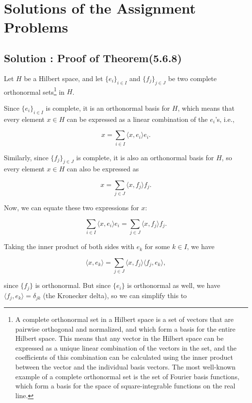 \documentclass[12pt, a4paper]{article} %
\begin{document}
    \pagebreak
    

    
    \section{Solutions of the Assignment Problems}
    
    \subsection{Solution : Proof of Theorem(5.6.8)}


    

        Let $H$ be a Hilbert space, and let $\{e_i\}_{i\in I}$ and $\{f_j\}_{j\in J}$ be two complete orthonormal sets\footnote{A complete orthonormal set in a Hilbert space is a set of vectors that are pairwise orthogonal and normalized, and which form a basis for the entire Hilbert space. This means that any vector in the Hilbert space can be expressed as a unique linear combination of the vectors in the set, and the coefficients of this combination can be calculated using the inner product between the vector and the individual basis vectors. The most well-known example of a complete orthonormal set is the set of Fourier basis functions, which form a basis for the space of square-integrable functions on the real line.} in $H$.

        Since $\{e_i\}_{i\in I}$ is complete, it is an orthonormal basis for $H$, which means that every element $x\in H$ can be expressed as a linear combination of the $e_i$'s, i.e.,

        \[x=\sum_{i\in I}\langle x,e_i\rangle e_i.\]

        Similarly, since $\{f_j\}_{j\in J}$ is complete, it is also an orthonormal basis for $H$, so every element $x\in H$ can also be expressed as

        \[x=\sum_{j\in J}\langle x,f_j\rangle f_j.\]

        Now, we can equate these two expressions for $x$:

       \[\sum_{i\in I}\langle x,e_i\rangle e_i=\sum_{j\in J}\langle x,f_j\rangle f_j.\]

        Taking the inner product of both sides with $e_k$ for some $k\in I$, we have

        \[\langle x,e_k\rangle=\sum_{j\in J}\langle x,f_j\rangle\langle f_j,e_k\rangle,\]

        since $\{f_j\}$ is orthonormal. But since $\{e_i\}$ is orthonormal as well, we have $\langle f_j,e_k\rangle=\delta_{jk}$ (the Kronecker delta), so we can simplify this to
\end{document}
